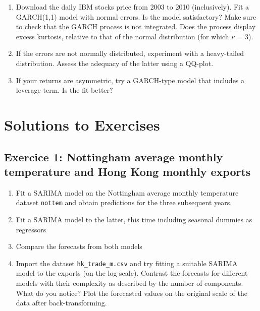 \documentclass[]{book}
\providecommand{\tightlist}{%
  \setlength{\itemsep}{0pt}\setlength{\parskip}{0pt}}
\begin{document}
\begin{enumerate}
\def\labelenumi{\arabic{enumi}.}
\tightlist
\item
  Download the daily IBM stocks price from 2003 to 2010 (inclusively).
  Fit a GARCH(1,1) model with normal errors. Is the model satisfactory?
  Make sure to check that the GARCH process is not integrated. Does the
  process display excess kurtosis, relative to that of the normal
  distribution (for which \(\kappa=3\)).
\item
  If the errors are not normally distributed, experiment with a
  heavy-tailed distribution. Assess the adequacy of the latter using a
  QQ-plot.
\item
  If your returns are asymmetric, try a GARCH-type model that includes a
  leverage term. Is the fit better?
\end{enumerate}

\hypertarget{solutions-to-exercises-2}{%
\section{Solutions to Exercises}\label{solutions-to-exercises-2}}

\hypertarget{exercice-1-nottingham-average-monthly-temperature-and-hong-kong-monthly-exports-1}{%
\subsection{Exercice 1: Nottingham average monthly temperature and Hong
Kong monthly
exports}\label{exercice-1-nottingham-average-monthly-temperature-and-hong-kong-monthly-exports-1}}

\begin{enumerate}
\def\labelenumi{\arabic{enumi}.}
\tightlist
\item
  Fit a SARIMA model on the Nottingham average monthly temperature
  dataset \texttt{nottem} and obtain predictions for the three
  subsequent years.
\item
  Fit a SARIMA model to the latter, this time including seasonal dummies
  as regressors
\item
  Compare the forecasts from both models
\item
  Import the dataset \texttt{hk\_trade\_m.csv} and try fitting a
  suitable SARIMA model to the exports (on the log scale). Contrast the
  forecasts for different models with their complexity as described by
  the number of components. What do you notice? Plot the forecasted
  values on the original scale of the data after back-transforming.
\end{enumerate}
\end{document}
